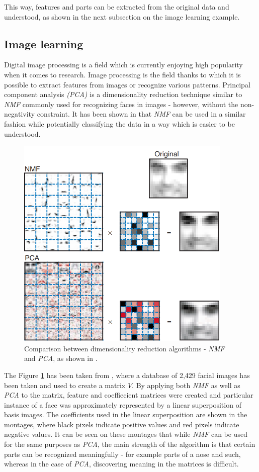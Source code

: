 \documentclass[thesis=M,english]{FITthesis}[2012/10/20]
\begin{document}
This way, features and parts can be extracted from
the original data and understood, as shown in the next subsection on the
image learning example.


\subsection{Image learning}
Digital image processing is a field which is currently enjoying high
popularity when it comes to research. Image processing is the field thanks
to which it is possible to extract features from images or recognize
various patterns. Principal component analysis \emph{(PCA)} is a dimensionality
reduction technique similar to \emph{NMF} commonly used for recognizing
faces in images \cite{pca-facial} - however, without the non-negativity constraint.
It has been shown in \cite{lee99} that \emph{NMF} can be used in a similar
fashion while potentially classifying the data in a way which is easier to be understood.
\\

\begin{figure}[h]
  \centering
  \includegraphics{nmfpca-comparison}
  \caption{Comparison between dimensionality reduction algorithms - \emph{NMF} and \emph{PCA},
           as shown in \cite{lee99}.}
  \label{fig:nmfpca-comparison}
\end{figure}

The Figure \ref{fig:nmfpca-comparison} has been taken from \cite{lee99}, where a database of
2,429 facial images has been taken and used to create a matrix $V$. By
applying both \emph{NMF} as well as \emph{PCA} to the matrix, feature
and coeffiecient matrices were created and particular instance of a
face was approximately represented by a linear superposition of basis
images. The coefficients used in the linear superposition are shown in the
montages, where black pixels indicate positive values and red pixels indicate
negative values. It can be seen on these montages that while \emph{NMF}
can be used for the same purposes as \emph{PCA}, the main strength of the
algorithm is that certain parts can be recognized meaningfully - for example
parts of a nose and such, whereas in the case of \emph{PCA}, discovering
meaning in the matrices is difficult.
\\
\end{document}

